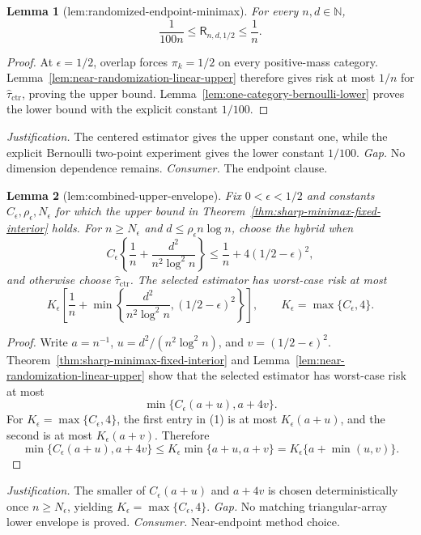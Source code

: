 \documentclass{article}
\newtheorem{lemma}{Lemma}
\begin{document}
\begin{lemma}[lem:randomized-endpoint-minimax]\label{lem:randomized-endpoint-minimax}
For every \(n,d\in\mathbb N\),
\[
\frac{1}{100n}\le\mathsf R_{n,d,1/2}\le\frac1n.
\]
\end{lemma}
\begin{proof}
At \(\epsilon=1/2\), overlap forces \(\pi_k=1/2\) on every positive-mass category. Lemma~\ref{lem:near-randomization-linear-upper} therefore gives risk at most \(1/n\) for \(\widehat\tau_{\mathrm{ctr}}\), proving the upper bound. Lemma~\ref{lem:one-category-bernoulli-lower} proves the lower bound with the explicit constant \(1/100\).
\end{proof}
\par\smallskip\noindent \textit{Justification.} The centered estimator gives the upper constant one, while the explicit Bernoulli two-point experiment gives the lower constant \(1/100\). \textit{Gap.} No dimension dependence remains. \textit{Consumer.} The endpoint clause.

\begin{lemma}[lem:combined-upper-envelope]\label{lem:combined-upper-envelope}
Fix \(0<\epsilon<1/2\) and constants \(C_\epsilon,\rho_\epsilon,N_\epsilon\) for which the upper bound in Theorem~\ref{thm:sharp-minimax-fixed-interior} holds. For \(n\ge N_\epsilon\) and \(d\le\rho_\epsilon n\log n\), choose the hybrid when
\[
C_\epsilon\left\{\frac1n+\frac{d^2}{n^2\log^2n}\right\}\le\frac1n+4(1/2-\epsilon)^2,
\]
and otherwise choose \(\widehat\tau_{\mathrm{ctr}}\). The selected estimator has worst-case risk at most
\[
K_\epsilon\left[\frac1n+\min\left\{\frac{d^2}{n^2\log^2n},(1/2-\epsilon)^2\right\}\right],\qquad K_\epsilon=\max\{C_\epsilon,4\}.
\]
\end{lemma}
\begin{proof}
Write \(a=n^{-1}\), \(u=d^2/(n^2\log^2n)\), and \(v=(1/2-\epsilon)^2\). Theorem~\ref{thm:sharp-minimax-fixed-interior} and Lemma~\ref{lem:near-randomization-linear-upper} show that the selected estimator has worst-case risk at most
\[
\min\{C_\epsilon(a+u),a+4v\}.
\tag{1}
\]
For \(K_\epsilon=\max\{C_\epsilon,4\}\), the first entry in (1) is at most \(K_\epsilon(a+u)\), and the second is at most \(K_\epsilon(a+v)\). Therefore
\[
\min\{C_\epsilon(a+u),a+4v\}
\le K_\epsilon\min\{a+u,a+v\}
=K_\epsilon\{a+\min(u,v)\}.
\tag{2}
\]
\end{proof}
\par\smallskip\noindent \textit{Justification.} The smaller of \(C_\epsilon(a+u)\) and \(a+4v\) is chosen deterministically once \(n\ge N_\epsilon\), yielding \(K_\epsilon=\max\{C_\epsilon,4\}\). \textit{Gap.} No matching triangular-array lower envelope is proved. \textit{Consumer.} Near-endpoint method choice.
\end{document}
